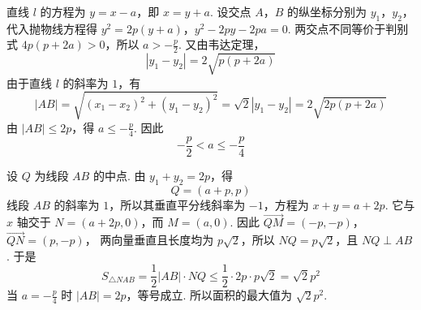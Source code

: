 \begin{solution}
直线 \(l\) 的方程为 \(y=x-a\)，即 \(x=y+a\). 设交点 \(A\)，\(B\) 的纵坐标分别为 \(y_1\)，\(y_2\)，代入抛物线方程得
\(y^2=2p(y+a)\)，\(y^2-2py-2pa=0\).
两交点不同等价于判别式 \(4p(p+2a)>0\)，所以 \(a>-\frac p2\). 又由韦达定理，
\[
|y_1-y_2|=2\sqrt{p(p+2a)}
\]
由于直线 \(l\) 的斜率为 \(1\)，有
\[
|AB|=\sqrt{(x_1-x_2)^2+(y_1-y_2)^2}=\sqrt2|y_1-y_2|=2\sqrt{2p(p+2a)}
\]
由 \(|AB|\leqslant2p\)，得 \(a\leqslant-\frac p4\). 因此
\[
-\frac p2<a\leqslant-\frac p4
\]

设 \(Q\) 为线段 \(AB\) 的中点. 由 \(y_1+y_2=2p\)，得
\[
Q=(a+p,p)
\]
线段 \(AB\) 的斜率为 \(1\)，所以其垂直平分线斜率为 \(-1\)，方程为 \(x+y=a+2p\). 它与 \(x\) 轴交于 \(N=(a+2p,0)\)，而 \(M=(a,0)\). 因此
\(\overrightarrow{QM}=(-p,-p)\)，\(\overrightarrow{QN}=(p,-p)\)，
两向量垂直且长度均为 \(p\sqrt2\)，所以 \(NQ=p\sqrt2\)，且 \(NQ\perp AB\). 于是
\[
S_{\triangle NAB}=\frac12|AB|\cdot NQ\leqslant\frac12\cdot2p\cdot p\sqrt2=\sqrt2p^2
\]
当 \(a=-\frac p4\) 时 \(|AB|=2p\)，等号成立. 所以面积的最大值为 \(\sqrt2p^2\).
\end{solution}
